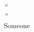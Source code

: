 \cleardoublepage
\thispagestyle{plain}

\vspace*{8cm}

\begin{flushright}
   \textsl{``\\
                ''} \\
\vspace*{1.5cm}
           Someone
\end{flushright}
